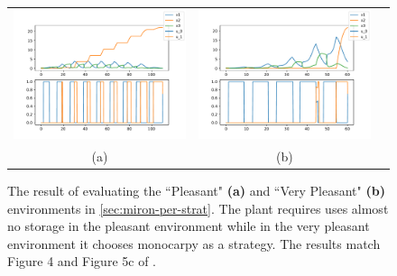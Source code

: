 \documentclass{article}
\begin{document}
\begin{figure}
  \centering
  \begin{tabular}{ccc}
    \includegraphics[width=3in]{imgs/MironchenkoFigure5e.pdf} &
    \includegraphics[width=3in]{imgs/Mironchenko_figure4.pdf} \\
    (a) & (b)
  \end{tabular}
  \caption{The result of evaluating the ``Pleasant" \textbf{(a)} and ``Very Pleasant" \textbf{(b)} environments in \autoref{sec:miron-per-strat}. The plant requires uses almost no storage in the pleasant environment while in the very pleasant environment it chooses monocarpy as a strategy. The results match Figure 4 and Figure 5c of \citep{mironchenko_optimal_2014}.\label{fig:mironchenko-fig4and5c}}
\end{figure}
\end{document}
